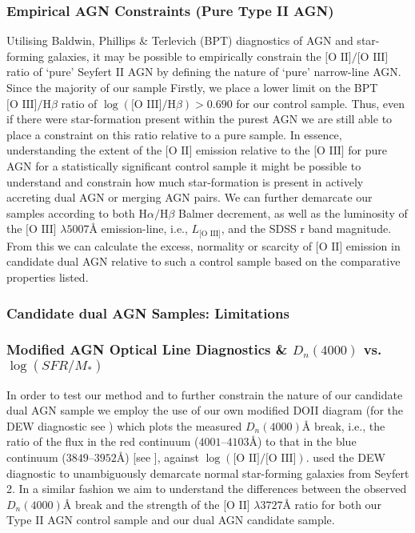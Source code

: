 \subsubsection{Empirical AGN Constraints (Pure Type II AGN)}

Utilising Baldwin, Phillips \& Terlevich (BPT) diagnostics of AGN and star-forming galaxies, it may be possible to empirically constrain the $\text{[O II]}/\text{[O III]}$ ratio of `pure' Seyfert II AGN by defining the nature of `pure' narrow-line AGN. Since the majority of our sample Firstly, we place a lower limit on the BPT $\text{[O III]}/\text{H}\beta$ ratio of $\log(\text{[O III]}/\text{H}\beta)>{0.690}$ for our control sample. Thus, even if there were star-formation present within the purest AGN we are still able to place a constraint on this ratio relative to a pure sample. In essence, understanding the extent of the $\text{[O II]}$ emission relative to the $\text{[O III]}$ for pure AGN for a statistically significant control sample it might be possible to understand and constrain how much star-formation is present in actively accreting dual AGN or merging AGN pairs. We can further demarcate our samples according to both $\text{H}\alpha/\text{H}\beta$ Balmer decrement, as well as the luminosity of the $\text{[O III]}$ $\lambda{5007}Å$ emission-line, i.e., $L_{\text{[O III]}}$, and the SDSS r band magnitude. From this we can calculate the excess, normality or scarcity of $\text{[O II]}$ emission in candidate dual AGN relative to such a control sample based on the comparative properties listed.

\subsubsection{Candidate dual AGN Samples: Limitations}
\subsubsection{Modified AGN Optical Line Diagnostics \& $D_{n}(4000)$ vs. $\log(SFR/M_{*})$}

In order to test our method and to further constrain the nature of our candidate dual AGN sample we employ the use of our own modified DOII diagram (for the DEW diagnostic see \cite{Stasinska_2006}) which plots the measured $D_{n}(4000)Å$ break, i.e., the ratio of the flux in the red continuum ($4001$--$4103$$Å$) to that in the blue continuum ($3849$--$3952$$Å$) [see \cite{Balogh_1999}], against $\log(\text{[O II]}/\text{[O III]})$. \cite{Marocco_2011} used the DEW diagnostic to unambiguously demarcate normal star-forming galaxies from Seyfert 2. In a similar fashion we aim to understand the differences between the observed $D_{n}(4000)Å$ break and the strength of the $\text{[O II]}$ $\lambda{3727}Å$ ratio for both our Type II AGN control sample and our dual AGN candidate sample.